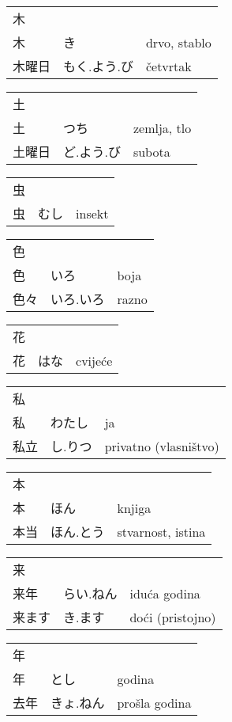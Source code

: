 

\newenvironment{dictentry}[1]{
	\begin{tabular}{p{2cm} p{3cm} p{10cm}}
		#1 &&\\
}{
	\end{tabular}
	\vspace{20pt}
}

\newcommand{\example}[3]{
	\hspace*{\fill}#1 & #2 & #3\\
}

\author{ロボット君}


\begin{dictentry}{木}
\example{木}{き}{drvo, stablo}
\example{木曜日}{もく.よう.び}{četvrtak}
\end{dictentry}

\begin{dictentry}{土}
\example{土}{つち}{zemlja, tlo}
\example{土曜日}{ど.よう.び}{subota}
\end{dictentry}

\begin{dictentry}{虫}
\example{虫}{むし}{insekt}
\end{dictentry}

\begin{dictentry}{色}
\example{色}{いろ}{boja}
\example{色々}{いろ.いろ}{razno}
\end{dictentry}

\begin{dictentry}{花}
\example{花}{はな}{cvijeće}
\end{dictentry}

\begin{dictentry}{私}
\example{私}{わたし}{ja}
\example{私立}{し.りつ}{privatno (vlasništvo)}
\end{dictentry}

\begin{dictentry}{本}
\example{本}{ほん}{knjiga}
\example{本当}{ほん.とう}{stvarnost, istina}
\end{dictentry}

\begin{dictentry}{来}
\example{来年}{らい.ねん}{iduća godina}
\example{来ます}{き.ます}{doći (pristojno)}
\end{dictentry}

\begin{dictentry}{年}
\example{年}{とし}{godina}
\example{去年}{きょ.ねん}{prošla godina}
\end{dictentry}

